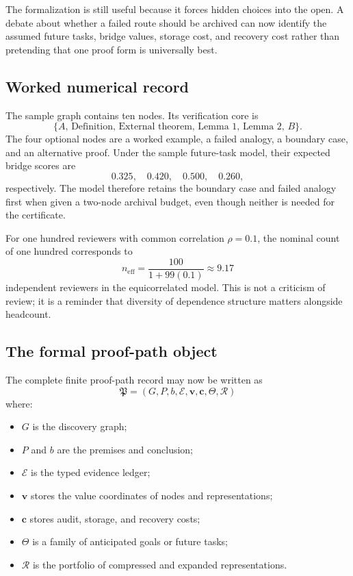 \documentclass[11pt,oneside]{book}
\theoremstyle{remark}
\begin{document}
The formalization is still useful because it forces hidden choices into the open.  A debate about whether a failed route should be archived can now identify the assumed future tasks, bridge values, storage cost, and recovery cost rather than pretending that one proof form is universally best.

\subsection{Worked numerical record}

The sample graph contains ten nodes.  Its verification core is
\[
\{A,\,\text{Definition},\,\text{External theorem},\,
\text{Lemma 1},\,\text{Lemma 2},\,B\}.
\]
The four optional nodes are a worked example, a failed analogy, a boundary case, and an alternative proof.  Under the sample future-task model, their expected bridge scores are
\[
0.325,
\quad
0.420,
\quad
0.500,
\quad
0.260,
\]
respectively.  The model therefore retains the boundary case and failed analogy first when given a two-node archival budget, even though neither is needed for the certificate.

For one hundred reviewers with common correlation \(\rho=0.1\), the nominal count of one hundred corresponds to
\[
n_{\mathrm{eff}}
=
\frac{100}{1+99(0.1)}
\approx 9.17
\]
independent reviewers in the equicorrelated model.  This is not a criticism of review; it is a reminder that diversity of dependence structure matters alongside headcount.

\subsection{The formal proof-path object}

The complete finite proof-path record may now be written as
\[
\boxed{
\mathfrak P
=
(G,P,b,\mathcal E,\mathbf v,\mathbf c,\Theta,\mathcal R)
}
\]
where:
\begin{itemize}
\item \(G\) is the discovery graph;
\item \(P\) and \(b\) are the premises and conclusion;
\item \(\mathcal E\) is the typed evidence ledger;
\item \(\mathbf v\) stores the value coordinates of nodes and representations;
\item \(\mathbf c\) stores audit, storage, and recovery costs;
\item \(\Theta\) is a family of anticipated goals or future tasks;
\item \(\mathcal R\) is the portfolio of compressed and expanded representations.
\end{itemize}
\end{document}
